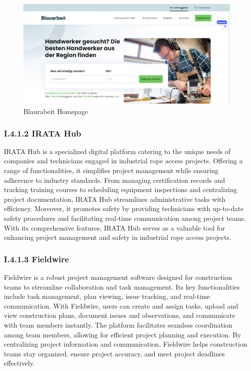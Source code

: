 \begin{figure}[H]
    \centering
    \includegraphics[width=1\textwidth]{src/assets/chapters/Blaurabeit.PNG}
    \caption{Blaurabeit Homepage}
    \label{fig:blaurabeit_image}
\end{figure}

\subsubsection*{I.4.1.2 IRATA Hub}

IRATA Hub is a specialized digital platform catering to the unique needs of companies and technicians engaged in industrial rope access projects. Offering a range of functionalities, it simplifies project management while ensuring adherence to industry standards. From managing certification records and tracking training courses to scheduling equipment inspections and centralizing project documentation, IRATA Hub streamlines administrative tasks with efficiency. Moreover, it promotes safety by providing technicians with up-to-date safety procedures and facilitating real-time communication among project teams. With its comprehensive features, IRATA Hub serves as a valuable tool for enhancing project management and safety in industrial rope access projects.


\subsubsection*{I.4.1.3 Fieldwire}

Fieldwire is a robust project management software designed for construction teams to streamline collaboration and task management. Its key functionalities include task management, plan viewing, issue tracking, and real-time communication. With Fieldwire, users can create and assign tasks, upload and view construction plans, document issues and observations, and communicate with team members instantly. The platform facilitates seamless coordination among team members, allowing for efficient project planning and execution. By centralizing project information and communication, Fieldwire helps construction teams stay organized, ensure project accuracy, and meet project deadlines effectively.


